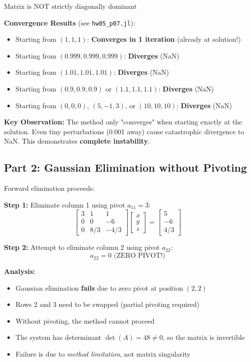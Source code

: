 $\boxed{\text{Matrix is NOT strictly diagonally dominant}}$

\textbf{Convergence Results} (see \texttt{hw05\_p07.jl}):
\begin{itemize}
\item Starting from $(1, 1, 1)$: \textbf{Converges in 1 iteration} (already at solution!)
\item Starting from $(0.999, 0.999, 0.999)$: \textbf{Diverges} (NaN)
\item Starting from $(1.01, 1.01, 1.01)$: \textbf{Diverges} (NaN)
\item Starting from $(0.9, 0.9, 0.9)$ or $(1.1, 1.1, 1.1)$: \textbf{Diverges} (NaN)
\item Starting from $(0, 0, 0)$, $(5, -1, 3)$, or $(10, 10, 10)$: \textbf{Diverges} (NaN)
\end{itemize}

\textbf{Key Observation:} The method only "converges" when starting exactly at the solution. Even tiny perturbations (0.001 away) cause catastrophic divergence to NaN. This demonstrates \textbf{complete instability}.

\subsection*{Part 2: Gaussian Elimination without Pivoting}

Forward elimination proceeds:

\textbf{Step 1:} Eliminate column 1 using pivot $a_{11} = 3$:
$$\begin{bmatrix} 3 & 1 & 1 \\ 0 & 0 & -6 \\ 0 & 8/3 & -4/3 \end{bmatrix}
\begin{bmatrix} x \\ y \\ z \end{bmatrix} = 
\begin{bmatrix} 5 \\ -6 \\ 4/3 \end{bmatrix}$$

\textbf{Step 2:} Attempt to eliminate column 2 using pivot $a_{22}$:
$$\boxed{a_{22} = 0 \text{ (ZERO PIVOT!)}}$$

\textbf{Analysis:} 
\begin{itemize}
\item Gaussian elimination \textbf{fails} due to zero pivot at position $(2,2)$
\item Rows 2 and 3 need to be swapped (partial pivoting required)
\item Without pivoting, the method cannot proceed
\item The system has determinant $\det(A) = 48 \neq 0$, so the matrix is invertible
\item Failure is due to \textit{method limitation}, not matrix singularity
\end{itemize}

